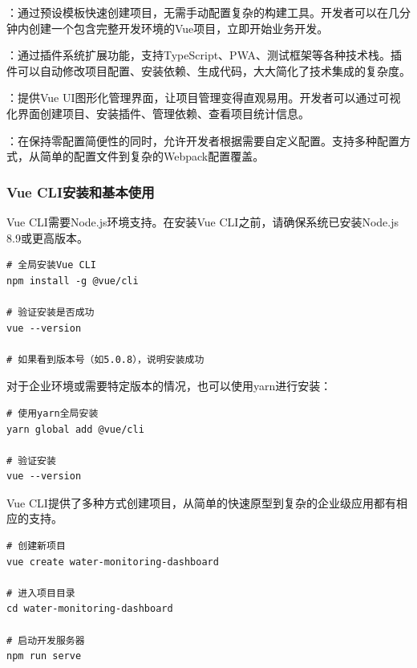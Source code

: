 
：通过预设模板快速创建项目，无需手动配置复杂的构建工具。开发者可以在几分钟内创建一个包含完整开发环境的Vue项目，立即开始业务开发。

：通过插件系统扩展功能，支持TypeScript、PWA、测试框架等各种技术栈。插件可以自动修改项目配置、安装依赖、生成代码，大大简化了技术集成的复杂度。

：提供Vue UI图形化管理界面，让项目管理变得直观易用。开发者可以通过可视化界面创建项目、安装插件、管理依赖、查看项目统计信息。

：在保持零配置简便性的同时，允许开发者根据需要自定义配置。支持多种配置方式，从简单的配置文件到复杂的Webpack配置覆盖。

\hypertarget{vue-cliux5b89ux88c5ux548cux57faux672cux4f7fux7528}{%
\subsubsection{Vue CLI安装和基本使用}\label{vue-cliux5b89ux88c5ux548cux57faux672cux4f7fux7528}}


Vue CLI需要Node.js环境支持。在安装Vue CLI之前，请确保系统已安装Node.js 8.9或更高版本。

\begin{lstlisting}[style=terminal]
# 全局安装Vue CLI
npm install -g @vue/cli

# 验证安装是否成功
vue --version

# 如果看到版本号（如5.0.8），说明安装成功
\end{lstlisting}

对于企业环境或需要特定版本的情况，也可以使用yarn进行安装：

\begin{lstlisting}[style=terminal]
# 使用yarn全局安装
yarn global add @vue/cli

# 验证安装
vue --version
\end{lstlisting}


Vue CLI提供了多种方式创建项目，从简单的快速原型到复杂的企业级应用都有相应的支持。

\begin{lstlisting}[style=terminal]
# 创建新项目
vue create water-monitoring-dashboard

# 进入项目目录
cd water-monitoring-dashboard

# 启动开发服务器
npm run serve
\end{lstlisting}

